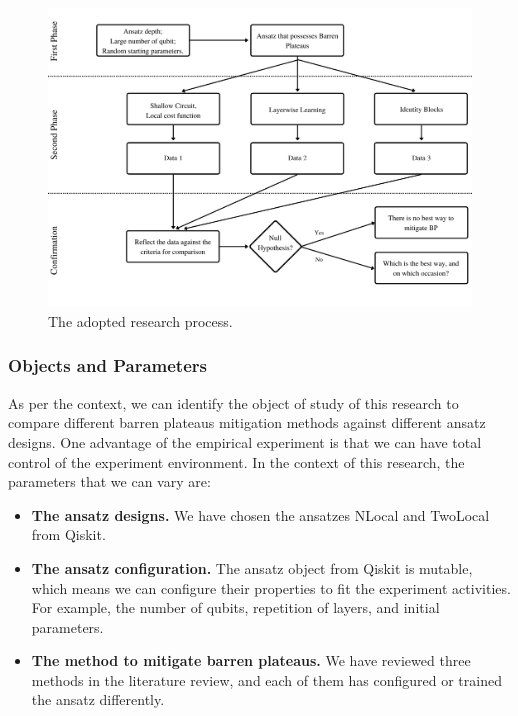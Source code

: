 \begin{figure}
    \centering
    \includegraphics[width=\textwidth]{./ResearchDesign/Appendices/Method.png}
    \caption{
        The adopted research process.
    }
    \label{Research Activities}
\end{figure}

\subsubsection{Objects and Parameters}

As per the context, we can identify the object of study of this research to compare different barren plateaus mitigation methods against different ansatz designs.
One advantage of the empirical experiment is that we can have total control of the experiment environment.
In the context of this research, the parameters that we can vary are:
\begin{itemize}
    \item \textbf{The ansatz designs.} We have chosen the ansatzes NLocal and TwoLocal from Qiskit.
    \item \textbf{The ansatz configuration.} The ansatz object from Qiskit is mutable, which means we can configure their properties to fit the experiment activities. For example, the number of qubits, repetition of layers, and initial parameters.
    \item \textbf{The method to mitigate barren plateaus.} We have reviewed three methods in the literature review, and each of them has configured or trained the ansatz differently.
\end{itemize}

